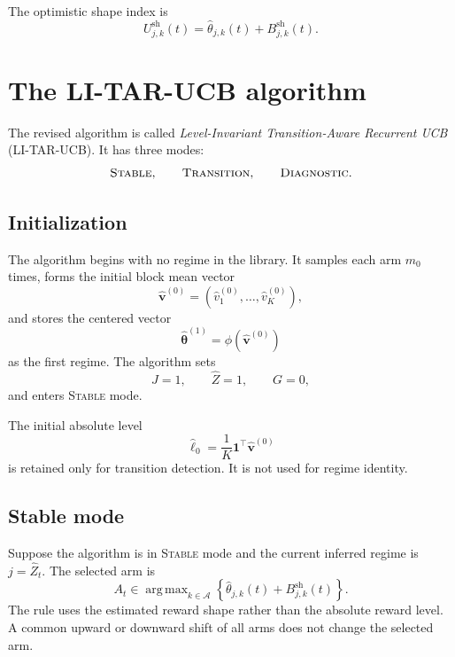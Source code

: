 \documentclass[11pt]{article}
\newcommand{\A}{\mathcal A}
\newcommand{\one}{\bm 1}
\DeclareMathOperator*{\argmax}{arg\,max}
\begin{document}
The optimistic shape index is
\begin{equation}
\label{eq:shape_ucb_index}
U_{j,k}^{\mathrm{sh}}(t)
=
\widehat\theta_{j,k}(t)+B_{j,k}^{\mathrm{sh}}(t).
\end{equation}

\section{The LI-TAR-UCB algorithm}
\label{sec:algorithm}

The revised algorithm is called \emph{Level-Invariant Transition-Aware Recurrent UCB} (LI-TAR-UCB). It has three modes:
\begin{equation}
\label{eq:modes}
\textsc{Stable},
\qquad
\textsc{Transition},
\qquad
\textsc{Diagnostic}.
\end{equation}

\subsection{Initialization}
\label{subsec:initialization}

The algorithm begins with no regime in the library. It samples each arm $m_0$ times, forms the initial block mean vector
\begin{equation}
\label{eq:init_vector}
\widehat{\bm v}^{(0)}
=
(\widehat v_1^{(0)},\ldots,\widehat v_K^{(0)}),
\end{equation}
and stores the centered vector
\begin{equation}
\label{eq:init_shape}
\widehat{\bm\theta}^{(1)}
=
\phi(\widehat{\bm v}^{(0)})
\end{equation}
as the first regime. The algorithm sets
\begin{equation}
\label{eq:init_state}
J=1,
\qquad
\widehat Z=1,
\qquad
G=0,
\end{equation}
and enters \textsc{Stable} mode.

The initial absolute level
\begin{equation}
\label{eq:init_level}
\widehat\ell_0=\frac{1}{K}\one^\top\widehat{\bm v}^{(0)}
\end{equation}
is retained only for transition detection. It is not used for regime identity.

\subsection{Stable mode}
\label{subsec:stable_mode}

Suppose the algorithm is in \textsc{Stable} mode and the current inferred regime is $j=\widehat Z_t$. The selected arm is
\begin{equation}
\label{eq:stable_shape_ucb_rule}
A_t
\in
\argmax_{k\in\A}
\left\{
\widehat\theta_{j,k}(t)+B_{j,k}^{\mathrm{sh}}(t)
\right\}.
\end{equation}
The rule uses the estimated reward shape rather than the absolute reward level. A common upward or downward shift of all arms does not change the selected arm.
\end{document}
